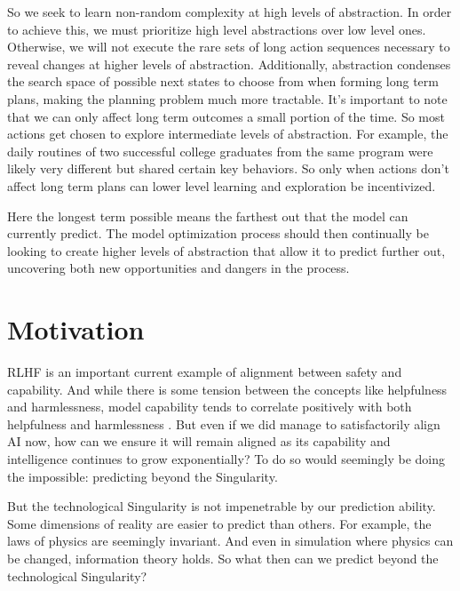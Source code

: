 \documentclass{article}
\begin{document}
So we seek to learn non-random complexity at high levels of abstraction. In order to achieve this, we must prioritize high level abstractions over low level ones. Otherwise, we will not execute the rare sets of long action sequences necessary to reveal changes at higher levels of abstraction. Additionally, abstraction condenses the search space of possible next states \cite{BerliacHierachialRL2019} to choose from when forming long term plans, making the planning problem much more tractable. It's important to note that we can only affect long term outcomes a small portion of the time. So most actions get chosen to explore intermediate levels of abstraction. For example, the daily routines of two successful college graduates from the same program were likely very different but shared certain key behaviors. So only when actions don't affect long term plans can lower level learning and exploration be incentivized.

Here the longest term possible means the farthest out that the model can currently predict. The model optimization process should then continually \cite{stanley2005evolving} be looking to create higher levels of abstraction that allow it to predict further out, uncovering both new opportunities and dangers in the process.

\section{Motivation}
RLHF \cite{christiano2017deep}\cite{ouyang2022training} is an important current example of alignment between safety and capability. And while there is some tension between the concepts like helpfulness and harmlessness, model capability tends to correlate positively with both helpfulness and harmlessness \cite{bai2022training}. But even if we did manage to satisfactorily align AI now, how can we ensure it will remain aligned as its capability and intelligence continues to grow exponentially?
To do so would seemingly be doing the impossible: predicting beyond the Singularity.

But the technological Singularity is not impenetrable by our prediction ability. Some dimensions of reality are easier to predict than others. For example, the laws of physics are seemingly invariant. And even in simulation where physics can be changed, information theory holds. So what then can we predict beyond the technological Singularity?
\end{document}
